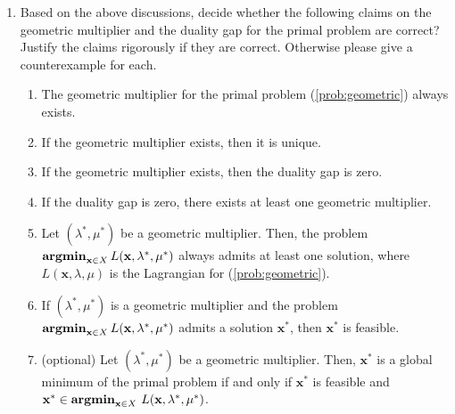 \documentclass[11pt,letter,notitlepage]{article}
\DeclareMathOperator*{\argmin}{\bf argmin}
\begin{document}
\begin{exercise}
\begin{enumerate}
    \item Based on the above discussions, decide whether the following claims on the geometric multiplier and the duality gap for the primal problem are correct? Justify the claims rigorously if they are correct. Otherwise please give a counterexample for each.
    \begin{enumerate}
        \item The geometric multiplier for the primal problem (\ref{prob:geometric}) always exists.
        \item If the geometric multiplier exists, then it is unique.
        \item If the geometric multiplier exists, then the duality gap is zero.
        \item If the duality gap is zero, there exists at least one geometric multiplier.
        \item Let $(\lambda^*,\mu^*)$ be a geometric multiplier. Then, the problem $\argmin_{\mathbf{x}\in X} L(\mathbf{x}, \lambda^*,\mu^*)$ always admits at least one solution, where $L(\mathbf{x}, \lambda, \mu)$ is the Lagrangian for (\ref{prob:geometric}).
        \item If $(\lambda^*,\mu^*)$ is a geometric multiplier and the problem $\argmin_{\mathbf{x}\in X} L(\mathbf{x}, \lambda^*,\mu^*)$ admits a solution $\mathbf{x}^*$, then $\mathbf{x}^*$ is feasible.
        \item (optional) Let $(\lambda^*,\mu^*)$ be a geometric multiplier. Then, $\mathbf{x}^*$ is a global minimum of the primal problem if and only if $\mathbf{x}^*$ is feasible and $\mathbf{x}^*\in\argmin_{\mathbf{x}\in X}\,L(\mathbf{x},\lambda^*,\mu^*)$.
    \end{enumerate}
\end{enumerate}
\end{exercise}

\newpage
\end{document}
